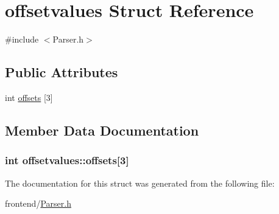 \hypertarget{structoffsetvalues}{\section{offsetvalues Struct Reference}
\label{structoffsetvalues}
}


{\ttfamily \#include $<$Parser.\-h$>$}

\subsection*{Public Attributes}
\begin{DoxyCompactItemize}
\item 
int \hyperlink{structoffsetvalues_ad39c312efc78e0df6c9b11c24f3b41a7}{offsets} \mbox{[}3\mbox{]}
\end{DoxyCompactItemize}


\subsection{Member Data Documentation}
\hypertarget{structoffsetvalues_ad39c312efc78e0df6c9b11c24f3b41a7}{
\subsubsection[{offsets}]{\setlength{\rightskip}{0pt plus 5cm}int offsetvalues\-::offsets\mbox{[}3\mbox{]}}}\label{structoffsetvalues_ad39c312efc78e0df6c9b11c24f3b41a7}


The documentation for this struct was generated from the following file\-:\begin{DoxyCompactItemize}
\item 
frontend/\hyperlink{Parser_8h}{Parser.\-h}\end{DoxyCompactItemize}
